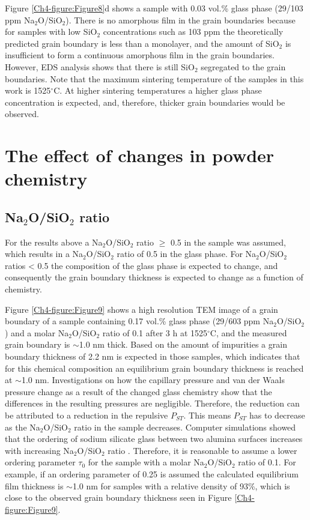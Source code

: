 Figure \ref{Ch4-figure:Figure8}d shows a sample with 0.03 vol.\% glass phase (29/103 ppm Na$_{2}$O/SiO$_{2}$). There is no amorphous film in the grain boundaries because for samples with low SiO$_{2}$ concentrations such as 103 ppm the theoretically predicted grain boundary is less than a monolayer, and the amount of SiO$_{2}$ is insufficient to form a continuous amorphous film in the grain boundaries. However, EDS analysis shows that there is still SiO$_{2}$ segregated to the grain boundaries. Note that the maximum sintering temperature of the samples in this work is 1525$^{\circ}$C. At higher sintering temperatures a higher glass phase concentration is expected, and, therefore, thicker grain boundaries would be observed.

\section{The effect of changes in powder chemistry}
\subsection{Na$_{2}$O/SiO$_{2}$ ratio}
For the results above a Na$_{2}$O/SiO$_{2}$ ratio $\geq$ 0.5 in the sample was assumed, which results in a Na$_{2}$O/SiO$_{2}$ ratio of 0.5 in the glass phase. For Na$_{2}$O/SiO$_{2}$ ratios < 0.5 the composition of the glass phase is expected to change, and consequently the grain boundary thickness is expected to change as a function of chemistry. 

Figure \ref{Ch4-figure:Figure9} shows a high resolution TEM image of a grain boundary of a sample containing 0.17 vol.\% glass phase (29/603 ppm Na$_{2}$O/SiO$_{2}$) and a molar Na$_{2}$O/SiO$_{2}$ ratio of 0.1 after 3 h at 1525$^{\circ}$C, and the measured grain boundary is $\sim$1.0 nm thick. Based on the amount of impurities a grain boundary thickness of 2.2 nm is expected in those samples, which indicates that for this chemical composition an equilibrium grain boundary thickness \cite{Subramaniam2006} is reached at $\sim$1.0 nm. Investigations on how the capillary pressure and van der Waals pressure change as a result of the changed glass chemistry show that the differences in the resulting pressures are negligible. Therefore, the reduction can be attributed to a reduction in the repulsive $P_{ST}$. This means $P_{ST}$ has to decrease as the Na$_{2}$O/SiO$_{2}$ ratio in the sample decreases. Computer simulations showed that the ordering of sodium silicate glass between two alumina surfaces increases with increasing Na$_{2}$O/SiO$_{2}$ ratio \cite{Litton1999}. Therefore, it is reasonable to assume a lower ordering parameter $\tau_{0}$ for the sample with a molar Na$_{2}$O/SiO$_{2}$ ratio of 0.1. For example, if an ordering parameter of 0.25 is assumed the calculated equilibrium film thickness is $\sim$1.0 nm for samples with a relative density of 93\%, which is close to the observed grain boundary thickness seen in Figure \ref{Ch4-figure:Figure9}.


